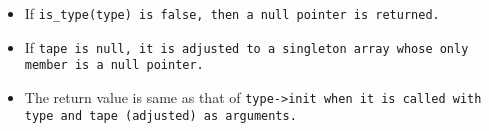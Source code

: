 \begin{itemize}[nosep]

\item If \tt{is_type(type)} is \tt{false}, then a null pointer is returned.

\item If \tt{tape} is null, it is adjusted to a
singleton array whose only member is a null pointer.

\item The return value is same as that of \tt{type->init} when it
is called with \tt{type} and \tt{tape} (adjusted) as arguments.

\end{itemize}
